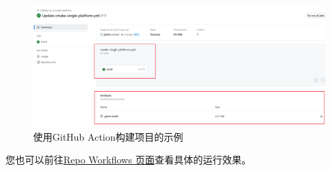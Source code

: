 \begin{figure}[!htbp]
    \centering
    \includegraphics[width=\textwidth]{Figures/github-ci.png}
    \caption{使用GitHub Action构建项目的示例}
    \label{fig:github-action}
\end{figure}

您也可以前往\href{https://github.com/jstar0/CppGame/actions/workflows/cmake-single-platform.yml}{Repo Workflows 页面}查看具体的运行效果。
